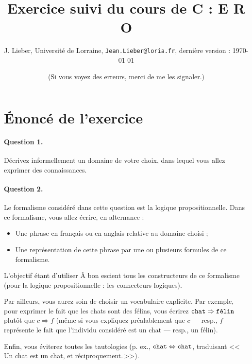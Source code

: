 \documentclass[11pt, a4paper]{article}
\def\fm#1{\text{\texttt{#1}}}
\def\lequiv{\Leftrightarrow}
\def\limplique{\Rightarrow}
\begin{document}
	
	\title{Exercice suivi du cours de C : E R O}
	\author{J. Lieber, Université de Lorraine, \texttt{Jean.Lieber@loria.fr}, dernière version : \today}
	\date{(Si vous voyez des erreurs, merci de me les signaler.)}
	\maketitle
	
	\section*{\'Enoncé de l'exercice}
	
	\paragraph{Question 1.}
	Décrivez informellement un domaine de votre choix, dans lequel vous
	allez exprimer des connaissances.
	
	\paragraph{Question 2.}
	Le formalisme considéré dans cette question est la logique propositionnelle.
	Dans ce formalisme, vous allez écrire, en alternance :
	\begin{itemize}
		\item
		Une phrase en français ou en anglais relative au domaine choisi ;
		\item
		Une représentation de cette phrase par une ou plusieurs formules de ce formalisme.
	\end{itemize}
	L'objectif étant d'utiliser Ã  bon escient tous les constructeurs de ce
	formalisme (pour la logique propositionnelle : les connecteurs logiques).
	
	Par ailleurs, vous aurez soin de choisir un vocabulaire explicite.
	Par exemple, pour exprimer le fait que les chats sont des félins,
	vous écrirez $\fm{chat}\limplique\fm{félin}$ plutôt que
	$c \limplique f$
	(même si vous expliquez préalablement que
	$c$ --- resp., $f$ --- représente le fait que
	l'individu considéré est un chat --- resp., un félin).
	
	Enfin, vous éviterez toutes les tautologies
	(p. ex., $\fm{chat}\lequiv\fm{chat}$,
	traduisant <<\,Un chat est un chat, et réciproquement.\,>>).
	
\end{document}
